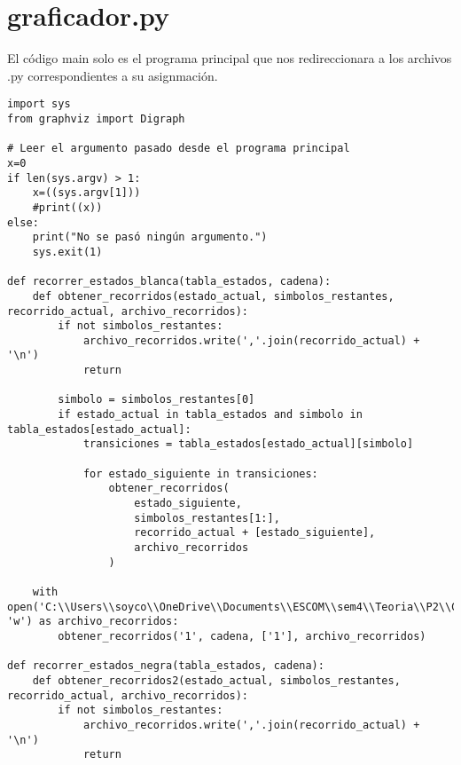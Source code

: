 \section{graficador.py}
El código main solo es el programa principal que nos redireccionara a los archivos .py correspondientes a su asignmación. \newline
\\
\begin{lstlisting}
import sys
from graphviz import Digraph

# Leer el argumento pasado desde el programa principal
x=0
if len(sys.argv) > 1:
    x=((sys.argv[1]))
    #print((x))
else:
    print("No se pasó ningún argumento.")
    sys.exit(1)

def recorrer_estados_blanca(tabla_estados, cadena):
    def obtener_recorridos(estado_actual, simbolos_restantes, recorrido_actual, archivo_recorridos):
        if not simbolos_restantes:
            archivo_recorridos.write(','.join(recorrido_actual) + '\n')
            return

        simbolo = simbolos_restantes[0]
        if estado_actual in tabla_estados and simbolo in tabla_estados[estado_actual]:
            transiciones = tabla_estados[estado_actual][simbolo]

            for estado_siguiente in transiciones:
                obtener_recorridos(
                    estado_siguiente,
                    simbolos_restantes[1:],
                    recorrido_actual + [estado_siguiente],
                    archivo_recorridos
                )

    with open('C:\\Users\\soyco\\OneDrive\\Documents\\ESCOM\\sem4\\Teoria\\P2\\Chess\\output\\recorridos_blanca.txt', 'w') as archivo_recorridos:
        obtener_recorridos('1', cadena, ['1'], archivo_recorridos)

def recorrer_estados_negra(tabla_estados, cadena):
    def obtener_recorridos2(estado_actual, simbolos_restantes, recorrido_actual, archivo_recorridos):
        if not simbolos_restantes:
            archivo_recorridos.write(','.join(recorrido_actual) + '\n')
            return


\end{lstlisting}
